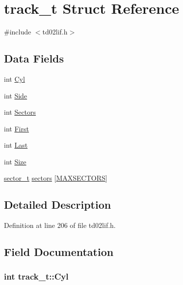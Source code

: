\hypertarget{structtrack__t}{}\section{track\+\_\+t Struct Reference}
\label{structtrack__t}


{\ttfamily \#include $<$td02lif.\+h$>$}

\subsection*{Data Fields}
\begin{DoxyCompactItemize}
\item 
int \hyperlink{structtrack__t_ab0489765c2499c501ce16426ec2b0c86}{Cyl}
\item 
int \hyperlink{structtrack__t_ad8ed890a8194525d7162dee414180635}{Side}
\item 
int \hyperlink{structtrack__t_a9a073d98f27d50ffda7991ea8099f269}{Sectors}
\item 
int \hyperlink{structtrack__t_a1ffa3863c3fb622cb158e5275c99c55c}{First}
\item 
int \hyperlink{structtrack__t_a9ebaf56b7b9c814e5e9c39dea130fa18}{Last}
\item 
int \hyperlink{structtrack__t_ab0e996e402d1d61b694b80a1c866177e}{Size}
\item 
\hyperlink{structsector__t}{sector\+\_\+t} \hyperlink{structtrack__t_af5a5bc7c09b032d06fe21a18f08772db}{sectors} \mbox{[}\hyperlink{td02lif_8h_a39ad5a6dea9e9b9d5314d32f397fee7d}{M\+A\+X\+S\+E\+C\+T\+O\+RS}\mbox{]}
\end{DoxyCompactItemize}


\subsection{Detailed Description}


Definition at line 206 of file td02lif.\+h.



\subsection{Field Documentation}
\subsubsection[{\texorpdfstring{Cyl}{Cyl}}]{\setlength{\rightskip}{0pt plus 5cm}int track\+\_\+t\+::\+Cyl}\hypertarget{structtrack__t_ab0489765c2499c501ce16426ec2b0c86}{}\label{structtrack__t_ab0489765c2499c501ce16426ec2b0c86}


